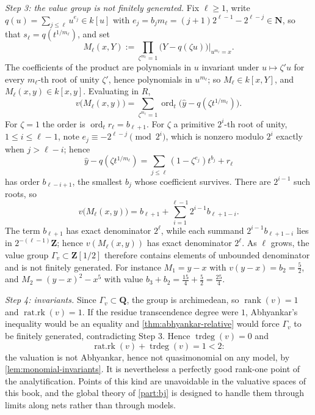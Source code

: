 \begin{example}
\emph{Step 3: the value group is not finitely generated.} Fix
$\ell\geq1$, write $q(u)=\sum_{j\leq\ell}u^{e_j}\in k[u]$ with
$e_j=b_jm_\ell=(j+1)2^{\ell-1}-2^{\ell-j}\in\mathbf N$, so that
$s_\ell=q(t^{1/m_\ell})$, and set
\[
 M_\ell(x,Y)
 :=\prod_{\zeta^{m_\ell}=1}\bigl(Y-q(\zeta u)\bigr)\Big|_{u^{m_\ell}=x} .
\]
The coefficients of the product are polynomials in $u$ invariant under
$u\mapsto\zeta'u$ for every $m_\ell$-th root of unity $\zeta'$, hence
polynomials in $u^{m_\ell}$; so $M_\ell\in k[x,Y]$, and
$M_\ell(x,y)\in k[x,y]$. Evaluating in $R$,
\[
 v\bigl(M_\ell(x,y)\bigr)
 =\sum_{\zeta^{m_\ell}=1}
 \operatorname{ord}_t\bigl(\hat y-q(\zeta t^{1/m_\ell})\bigr).
\]
For $\zeta=1$ the order is $\operatorname{ord}_tr_\ell=b_{\ell+1}$. For
$\zeta$ a primitive $2^i$-th root of unity, $1\leq i\leq\ell-1$, note
$e_j\equiv-2^{\ell-j}\pmod{2^i}$, which is nonzero modulo $2^i$ exactly
when $j>\ell-i$; hence
\[
 \hat y-q(\zeta t^{1/m_\ell})
 =\sum_{j\leq\ell}(1-\zeta^{e_j})t^{b_j}+r_\ell
\]
has order $b_{\ell-i+1}$, the smallest $b_j$ whose coefficient survives.
There are $2^{i-1}$ such roots, so
\[
 v\bigl(M_\ell(x,y)\bigr)
 =b_{\ell+1}+\sum_{i=1}^{\ell-1}2^{i-1}b_{\ell+1-i}.
\]
The term $b_{\ell+1}$ has exact denominator $2^{\ell}$, while each
summand $2^{i-1}b_{\ell+1-i}$ lies in $2^{-(\ell-1)}\mathbf Z$; hence
$v(M_\ell(x,y))$ has exact denominator $2^{\ell}$. As $\ell$ grows, the
value group $\Gamma_v\subset\mathbf Z[1/2]$ therefore contains elements
of unbounded denominator and is not finitely generated. For instance
$M_1=y-x$ with $v(y-x)=b_2=\tfrac52$, and
$M_2=(y-x)^2-x^5$ with value $b_3+b_2=\tfrac{15}4+\tfrac52=\tfrac{25}4$.

\emph{Step 4: invariants.} Since
$\Gamma_v\subset\mathbf Q$, the group is archimedean, so
$\operatorname{rank}(v)=1$ and $\operatorname{rat.rk}(v)=1$. If the
residue transcendence degree were $1$, Abhyankar's inequality would be an
equality and \cref{thm:abhyankar-relative} would force $\Gamma_v$ to be
finitely generated, contradicting Step 3. Hence
$\operatorname{trdeg}(v)=0$ and
\[
 \operatorname{rat.rk}(v)+\operatorname{trdeg}(v)=1<2 :
\]
the valuation is not Abhyankar, hence not quasimonomial on any model, by
\cref{lem:monomial-invariants}. It is nevertheless a perfectly good
rank-one point of the analytification. Points of this kind are unavoidable in
the valuative spaces of this book, and the global theory of
\cref{part:bj} is designed to handle them through limits along nets
rather than through models.
\end{example}

